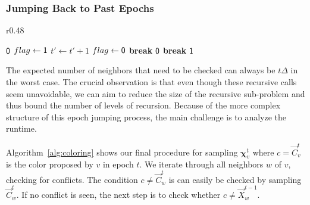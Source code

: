 \subsubsection{Jumping Back to Past Epochs}
\label{sec:jumping_back_to_past_epochs}
\begin{wrapfigure}[18]{r}{0.48\textwidth}
\vspace{-3.0em}
\begin{framed}
    \renewcommand\figurename{Algorithm}
    \caption{Checking if proposal is accepted}
    \label{alg:coloring}
    \begin{algorithmic}[1]
                    \State \Return $\mathsf{0}$
                \EndIf
                        \State $flag\gets \mathsf{1}$
                            \State $t'\gets t' + 1$
                                \State $flag\gets \mathsf{0}$
                                \State \textbf{break}
                            \EndIf
                        \EndWhile
                            \State \Return $\mathsf{0}$
                        \EndIf
                        \State \textbf{break}
                   \EndIf
                \EndFor
            \EndFor
            \State \Return $\mathsf{1}$
        \EndProcedure
    \end{algorithmic}
\end{framed}
\end{wrapfigure}
The expected number of neighbors that need to be checked can always be $t\Delta$ in the worst case.
The crucial observation is that even though these recursive calls seem unavoidable,
we can aim to reduce the size of the recursive sub-problem and thus bound the number of levels of recursion.
Because of the more complex structure of this epoch jumping process, the main challenge is to analyze the runtime.

Algorithm~\ref{alg:coloring} shows our final procedure for sampling $\bm\chi^t_v$ where $c =\vec C^t_v$ is the color proposed by $v$ in epoch $t$.
We iterate through all neighbors $w$ of $v$, checking for conflicts.
The condition $c\not=\vec C^t_w$ is can easily be checked by sampling $\vec C^t_w$.
If no conflict is seen, the next step is to check whether $c\not= \vec X^{t-1}_w$.

